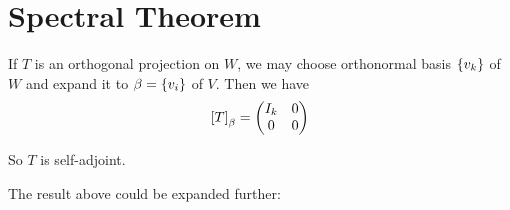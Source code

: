 \section{Spectral Theorem}


If $T$ is an orthogonal projection on $W$, we may choose orthonormal basis $\set{v_k}$ of $W$ and expand it to $\beta = \set{v_i}$ of $V$. Then we have
\begin{equation}
    \coordinate{T}_\beta = \begin{pmatrix}
        I_k & 0 \\
        0 & 0
    \end{pmatrix}
\end{equation}

So $T$ is self-adjoint.

The result above could be expanded further:

